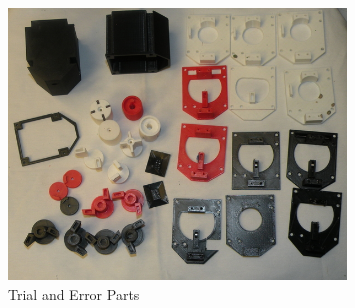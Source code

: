 \documentclass[12pt]{article}
\begin{document}
\begin{figure}[tb]
  \centering
  \includegraphics[width=0.8\textwidth]{TrialAndError1.jpg}
  \caption{Trial and Error Parts}
  \label{f_trial_and_error}
\end{figure}
\end{document}
